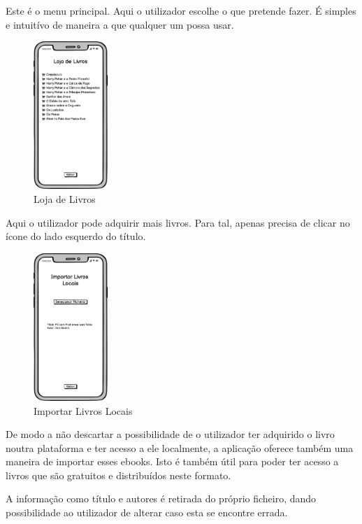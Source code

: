 \documentclass[11pt]{article}
\begin{document}
	Este é o menu principal. Aqui o utilizador escolhe o que pretende fazer. É simples e intuitívo de maneira a que qualquer um possa usar.
	
	\begin{figure}[H]
		\includegraphics[width=0.25\textwidth,height=0.88\textheight,keepaspectratio]{loja-livros}
		\centering
		\caption{Loja de Livros}
		\label{fig:loja}
	\end{figure}

	Aqui o utilizador pode adquirir mais livros. Para tal, apenas precisa de clicar no ícone do lado esquerdo do título.
	
	\begin{figure}[H]
		\includegraphics[width=0.25\textwidth,height=0.88\textheight,keepaspectratio]{importar-livros}
		\centering
		\caption{Importar Livros Locais}
		\label{fig:importar}
	\end{figure}
	
	De modo a não descartar a possibilidade de o utilizador ter adquirido o livro noutra plataforma e ter acesso a ele localmente, a aplicação oferece também uma maneira de importar esses ebooks. Isto é também útil para poder ter acesso a livros que são gratuitos e distribuídos neste formato.
	
	A informação como título e autores é retirada do próprio ficheiro, dando possibilidade ao utilizador de alterar caso esta se encontre errada.
\end{document}
